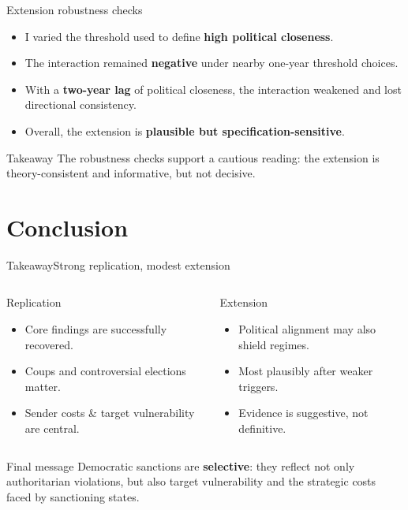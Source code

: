 \documentclass[
11pt,notheorems,hyperref={pdfauthor=Jakob}
]{beamer}
\begin{document}
	\begin{frame}{Extension robustness checks}
		\begin{itemize}
			\item I varied the threshold used to define \textbf{high political closeness}.
			\item The interaction remained \textbf{negative} under nearby one-year threshold choices.
			\item With a \textbf{two-year lag} of political closeness, the interaction weakened and lost directional consistency.
			\item Overall, the extension is \textbf{plausible but specification-sensitive}.
		\end{itemize}
		
		\vspace{0.6em}
		\begin{block}{Takeaway}
			The robustness checks support a cautious reading: the extension is theory-consistent and informative, but not decisive.
		\end{block}
	\end{frame}
		
	\section{Conclusion}
	
	\begin{frame}{Takeaway}{Strong replication, modest extension}
		\begin{columns}[T,onlytextwidth]
			\begin{block}{Replication}
				\begin{itemize}
					\item Core findings are successfully recovered.
					\item Coups and controversial elections matter.
					\item Sender costs \& target vulnerability are central.
				\end{itemize}
			\end{block}
			
			\begin{block}{Extension}
				\begin{itemize}
					\item Political alignment may also shield regimes.
					\item Most plausibly after weaker triggers.
					\item Evidence is suggestive, not definitive.
				\end{itemize}
			\end{block}
		\end{columns}
		
		\vspace{0.5em}
		\begin{alertblock}{Final message}
			Democratic sanctions are \textbf{selective}: they reflect not only authoritarian violations, but also target vulnerability and the strategic costs faced by sanctioning states.
		\end{alertblock}
	\end{frame}
	
\end{document}

